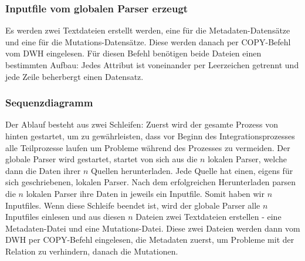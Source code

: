 \subsubsection{Inputfile vom globalen Parser erzeugt}
Es werden zwei Textdateien erstellt werden, eine für die Metadaten-Datensätze und eine für die Mutations-Datensätze. Diese werden danach per COPY-Befehl vom DWH eingelesen. Für diesen Befehl benötigen beide Dateien einen bestimmten Aufbau: Jedes Attribut ist voneinander per Leerzeichen getrennt und jede Zeile beherbergt einen Datensatz.
\subsubsection{Sequenzdiagramm}
Der Ablauf besteht aus zwei Schleifen: Zuerst wird der gesamte Prozess von hinten gestartet, um zu gewährleisten, dass vor Beginn des Integrationsprozesses alle Teilprozesse laufen um Probleme während des Prozesses zu vermeiden. Der globale Parser wird gestartet, startet von sich aus die $n$ lokalen Parser, welche dann die Daten ihrer $n$ Quellen herunterladen. Jede Quelle hat einen, eigens für sich geschriebenen, lokalen Parser. Nach dem erfolgreichen Herunterladen parsen die $n$ lokalen Parser ihre Daten in jeweils ein Inputfile. Somit haben wir $n$ Inputfiles. Wenn diese Schleife beendet ist, wird der globale Parser alle $n$ Inputfiles einlesen und aus diesen $n$ Dateien zwei Textdateien erstellen - eine Metadaten-Datei und eine Mutations-Datei. Diese zwei Dateien werden dann vom DWH per COPY-Befehl eingelesen, die Metadaten zuerst, um Probleme mit der Relation zu verhindern, danach die Mutationen.
\newpage
